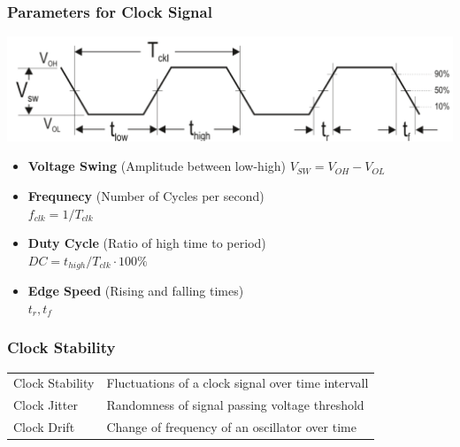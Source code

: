 \subsubsection{Parameters for Clock Signal }
\begin{minipage}{\linewidth}
    \centering
    \includegraphics[width=0.7\linewidth]{images/clock_parameters.png}
\end{minipage}
\begin{minipage}{\linewidth}
    \begin{multicols}{2}
	\begin{itemize}
		\item \textbf{Voltage Swing} (Amplitude between low-high) $V_{SW}=V_{OH}-V_{OL}$
		\item \textbf{Frequnecy} (Number of Cycles per second) \\$f_{clk}=1/T_{clk}$
		\item \textbf{Duty Cycle} (Ratio of high time to period)\\ $DC=t_{high}/T_{clk} \cdot 100 \%$
		\item \textbf{Edge Speed} (Rising and falling times)\\$t_r, t_f$
	\end{itemize}
\end{multicols}
\end{minipage}

\subsubsection{Clock Stability }
\begin{tabular}{ll}
	Clock Stability & Fluctuations of a clock signal over time intervall\\
	Clock Jitter & Randomness of signal passing voltage threshold\\
    Clock Drift & Change of frequency of an oscillator over time\\
\end{tabular}

\clearpage

\vspace{-0.5cm}
